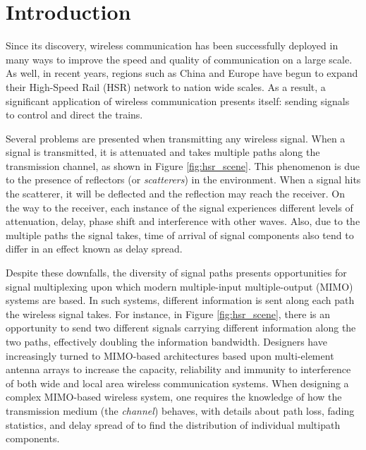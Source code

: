 \chapter{Introduction}
\pagestyle{fancy}
\fancyhead{}
\fancyhead[R]{\thepage}
\fancyfoot{}
\renewcommand{\headrulewidth}{0pt}
\renewcommand{\footrulewidth}{0pt}

\setcounter{page}{1}

Since its discovery, wireless communication has been successfully deployed in many ways to improve the speed and quality of communication on a large scale. As well, in recent years, regions such as China and Europe have begun to expand their High-Speed Rail (HSR) network to nation wide scales. As a result, a significant application of wireless communication presents itself: sending signals to control and direct the trains.

Several problems are presented when transmitting any wireless signal. When a signal is transmitted, it is attenuated and takes multiple paths along the transmission channel, as shown in Figure \ref{fig:hsr_scene}. This phenomenon is due to the presence of reflectors (or \emph{scatterers}) in the environment. When a signal hits the scatterer, it will be deflected and the reflection may reach the receiver. On the way to the receiver, each instance of the signal experiences different levels of attenuation, delay, phase shift and interference with other waves. Also, due to the multiple paths the signal takes, time of arrival of signal components also tend to differ in an effect known as delay spread.


Despite these downfalls, the diversity of signal paths presents opportunities for signal multiplexing upon which modern multiple-input multiple-output (MIMO) systems are based. In such systems, different information is sent along each path the wireless signal takes. For instance, in Figure \ref{fig:hsr_scene}, there is an opportunity to send two different signals carrying different information along the two paths, effectively doubling the information bandwidth. Designers have increasingly turned to MIMO-based architectures based upon multi-element antenna arrays to increase the capacity, reliability and immunity to interference of both wide and local area wireless communication systems. When designing a complex MIMO-based wireless system, one requires the knowledge of how the transmission medium (the \emph{channel}) behaves, with details about path loss, fading statistics, and delay spread of to find the distribution of individual multipath components.

